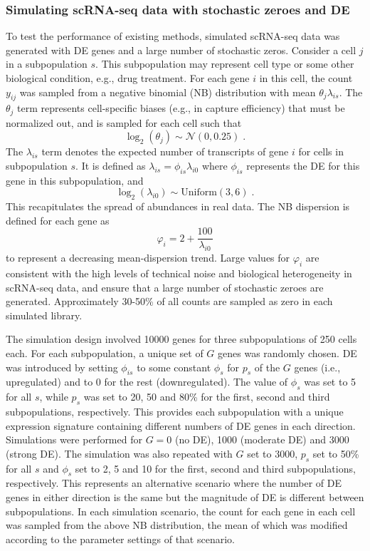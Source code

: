 \documentclass{bmcart}
\begin{document}
\subsubsection*{Simulating scRNA-seq data with stochastic zeroes and DE}
To test the performance of existing methods, simulated scRNA-seq data was generated with DE genes and a large number of stochastic zeros.
Consider a cell $j$ in a subpopulation $s$.
This subpopulation may represent cell type or some other biological condition, e.g., drug treatment. 
For each gene $i$ in this cell, the count $y_{ij}$ was sampled from a negative binomial (NB) distribution with mean $\theta_{j}\lambda_{is}$.
The $\theta_{j}$ term represents cell-specific biases (e.g., in capture efficiency) that must be normalized out, 
    and is sampled for each cell such that 
\[
\log_2(\theta_j) \sim \mathcal{N}(0, 0.25) \;.
\]
The $\lambda_{is}$ term denotes the expected number of transcripts of gene $i$ for cells in subpopulation $s$.
It is defined as $\lambda_{is}=\phi_{is}\lambda_{i0}$ where $\phi_{is}$ represents the DE for this gene in this subpopulation, and 
\[
\log_2(\lambda_{i0}) \sim \mbox{Uniform}(3, 6) \;.
\]
This recapitulates the spread of abundances in real data.
The NB dispersion is defined for each gene as 
\[
    \varphi_i = 2 + \frac{100}{\lambda_{i0}}
\]
to represent a decreasing mean-dispersion trend.
Large values for $\varphi_i$ are consistent with the high levels of technical noise and biological heterogeneity in scRNA-seq data,
    and ensure that a large number of stochastic zeroes are generated.
Approximately 30-50\% of all counts are sampled as zero in each simulated library.

The simulation design involved 10000 genes for three subpopulations of 250 cells each.
For each subpopulation, a unique set of $G$ genes was randomly chosen.
DE was introduced by setting $\phi_{is}$ to some constant $\phi_s$ for $p_s$ of the $G$ genes (i.e., upregulated) and to $0$ for the rest (downregulated).
The value of $\phi_s$ was set to 5 for all $s$, while $p_s$ was set to 20, 50 and 80\% for the first, second and third subpopulations, respectively.
This provides each subpopulation with a unique expression signature containing different numbers of DE genes in each direction.
Simulations were performed for $G = 0$ (no DE), 1000 (moderate DE) and 3000 (strong DE).
The simulation was also repeated with $G$ set to 3000, $p_s$ set to 50\% for all $s$ and $\phi_{s}$ set to 2, 5 and 10 for the first, second and third subpopulations, respectively.
This represents an alternative scenario where the number of DE genes in either direction is the same but the magnitude of DE is different between subpopulations.
In each simulation scenario, the count for each gene in each cell was sampled from the above NB distribution,
    the mean of which was modified according to the parameter settings of that scenario.
\end{document}
